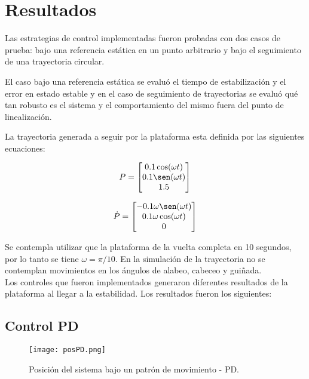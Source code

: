 
\section{Resultados}

Las estrategias de control implementadas fueron probadas con dos casos de prueba: bajo una referencia estática en un punto arbitrario y bajo el seguimiento de una trayectoria circular.

El caso bajo una referencia estática se evaluó el tiempo de estabilización y el error en estado estable y en el caso de seguimiento de trayectorias se evaluó qué tan robusto es el sistema y el comportamiento del mismo fuera del punto de linealización.

La trayectoria generada a seguir por la plataforma esta definida por las siguientes ecuaciones:

\begin{equation} \label{equ: pos_tray}
    P = \begin{bmatrix}
    0.1 \cos (\omega t) \\
    0.1 \sen (\omega t) \\
    1.5
    \end{bmatrix}
\end{equation}

\begin{equation}\label{equ: vel_tray}
    \dot{P} = \begin{bmatrix}
    -0.1 \omega \sen (\omega t) \\
    0.1 \omega \cos (\omega t) \\
    0
    \end{bmatrix}
\end{equation}

Se contempla utilizar que la plataforma de la vuelta completa en 10 segundos, por lo tanto se tiene $\omega = \pi / 10$. En la simulación de la trayectoria no se contemplan movimientos en los ángulos de alabeo, cabeceo y guiñada.\\

Los controles que fueron implementados generaron diferentes resultados de la plataforma al llegar a la estabilidad. Los resultados fueron los siguientes:

\subsection{Control PD}

\begin{figure}[H]
    \centering
    \texttt{[image: posPD.png]}
    \caption{Posición del sistema bajo un patrón de movimiento - PD.}
    \label{fig:PD position}
\end{figure}

